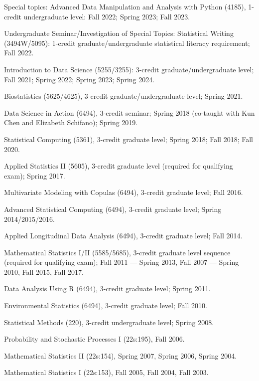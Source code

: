 \documentclass[Statistics]{vita}
\begin{document}
\begin{vita}
\begin{TeachingExperience}
\begin{UConn}
    \item Special topics: Advanced Data Manipulation and Analysis with Python (4185), 1-credit undergraduate level: Fall 2022; Spring 2023; Fall 2023.
    \item Undergraduate Seminar/Investigation of Special Topics: Statistical Writing (3494W/5095): 1-credit graduate/undergraduate statistical literacy requirement; Fall 2022.
    \item Introduction to Data Science (5255/3255): 3-credit graduate/undergraduate level; Fall 2021; Spring 2022; Spring 2023; Spring 2024.
    \item Biostatistics (5625/4625), 3-credit graduate/undergraduate level; Spring 2021.
    \item Data Science in Action (6494), 3-credit seminar; Spring 2018 (co-taught with Kun Chen and Elizabeth Schifano); Spring 2019.
    \item Statistical Computing (5361), 3-credit graduate level; Spring 2018; Fall 2018; Fall 2020.
    \item Applied Statistics II (5605), 3-credit graduate level (required for qualifying exam); Spring 2017.
    \item Multivariate Modeling with Copulas (6494), 3-credit graduate level; Fall 2016.
    \item Advanced Statistical Computing (6494), 3-credit graduate level; Spring 2014/2015/2016.
    \item Applied Longitudinal Data Analysis (6494), 3-credit graduate level; Fall 2014.
    \item Mathematical Statistics I/II (5585/5685), 3-credit graduate level sequence (required for qualifying exam); Fall 2011 --- Spring 2013, Fall 2007 --- Spring 2010, Fall 2015, Fall 2017.
    \item Data Analysis Using R (6494), 3-credit graduate level; Spring 2011.
    \item Environmental Statistics (6494), 3-credit graduate level; Fall 2010.
    \item Statistical Methods (220), 3-credit undergraduate level; Spring 2008.
    \end{UConn}
    \begin{UIowa}
    \item Probability and Stochastic Processes I (22s:195), Fall 2006.
    \item Mathematical Statistics II (22s:154), Spring 2007, Spring 2006, Spring 2004.
    \item Mathematical Statistics I (22s:153), Fall 2005, Fall 2004, Fall 2003.

\end{UIowa}
\end{TeachingExperience}
\end{vita}
\end{document}
